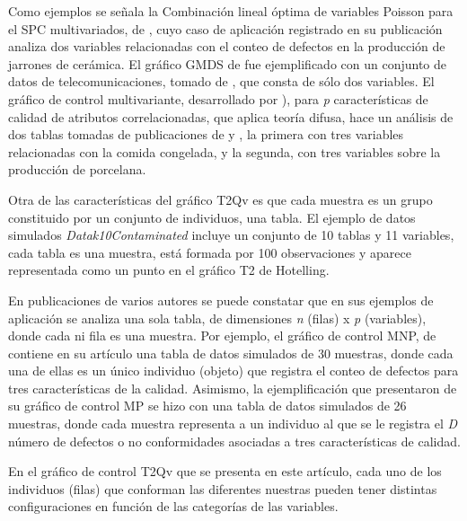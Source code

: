 \documentclass[mathematics,article,submit,moreauthors,pdftex]{mdpi}
\begin{document}
Como ejemplos se señala la Combinación lineal óptima de variables
Poisson para el SPC multivariados, de \citet{epprecht2013optimal}, cuyo
caso de aplicación registrado en su publicación analiza dos variables
relacionadas con el conteo de defectos en la producción de jarrones de
cerámica. El gráfico GMDS de \citet{raza2019design} fue ejemplificado
con un conjunto de datos de telecomunicaciones, tomado de
\citet{jiang2002process}, que consta de sólo dos variables. El gráfico
de control multivariante, desarrollado por
\citet{pastuizaca2015multivariate}), para \emph{p} características de
calidad de atributos correlacionadas, que aplica teoría difusa, hace un
análisis de dos tablas tomadas de publicaciones de
\citet{taleb2009control} y \citet{taleb2006multivariate}, la primera con
tres variables relacionadas con la comida congelada, y la segunda, con
tres variables sobre la producción de porcelana.

Otra de las características del gráfico T2Qv es que cada muestra es un
grupo constituido por un conjunto de individuos, una tabla. El ejemplo
de datos simulados \emph{Datak10Contaminated} incluye un conjunto de 10
tablas y 11 variables, cada tabla es una muestra, está formada por 100
observaciones y aparece representada como un punto en el gráfico T2 de
Hotelling.

En publicaciones de varios autores se puede constatar que en sus
ejemplos de aplicación se analiza una sola tabla, de dimensiones
\emph{n} (filas) x \emph{p} (variables), donde cada ni fila es una
muestra. Por ejemplo, el gráfico de control MNP, de
\citet{lu1998control} contiene en su artículo una tabla de datos
simulados de 30 muestras, donde cada una de ellas es un único individuo
(objeto) que registra el conteo de defectos para tres características de
la calidad. Asimismo, la ejemplificación que \citet{chiu2007}
presentaron de su gráfico de control MP se hizo con una tabla de datos
simulados de 26 muestras, donde cada muestra representa a un individuo
al que se le registra el \emph{D} número de defectos o no conformidades
asociadas a tres características de calidad.

En el gráfico de control T2Qv que se presenta en este artículo, cada uno
de los individuos (filas) que conforman las diferentes nuestras pueden
tener distintas configuraciones en función de las categorías de las
variables.
\end{document}
